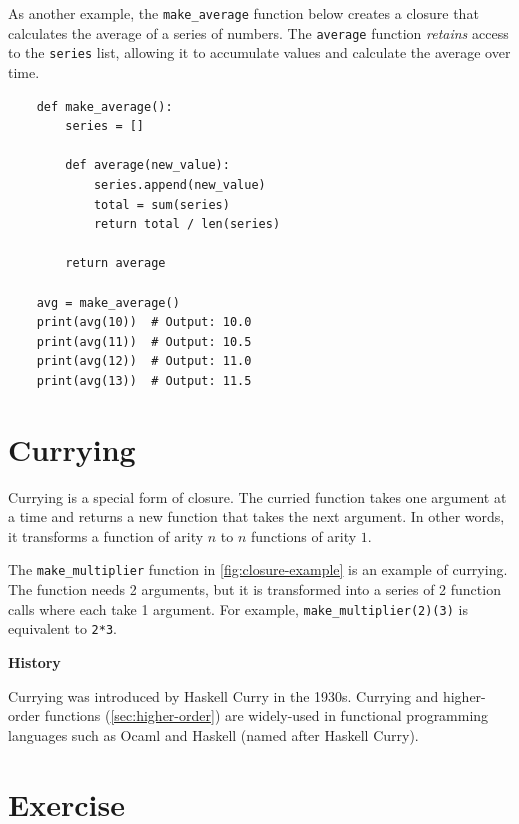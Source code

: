 \documentclass[oneside,11pt,dvipsnames]{book}
\newenvironment{historybox}[1][]{
  \small
  \begin{myhistorybox}
    {\small \textbf{#1}}
  }{
  \end{myhistorybox}
}
\newcommand{\code}[1]{\texttt{#1}}
\begin{document}
As another example, the \code{make\_average} function below creates a closure that calculates the average of a series of numbers. The \code{average} function \emph{retains} access to the \code{series} list, allowing it to accumulate values and calculate the average over time.


\begin{lstlisting}
    def make_average():
        series = []

        def average(new_value):
            series.append(new_value)
            total = sum(series)
            return total / len(series)

        return average

    avg = make_average()
    print(avg(10))  # Output: 10.0
    print(avg(11))  # Output: 10.5
    print(avg(12))  # Output: 11.0
    print(avg(13))  # Output: 11.5
\end{lstlisting}







\section{Currying}\label{sec:curry}

Currying is a special form of closure. The curried function takes one argument at a time and returns a new function that takes the next argument. In other words, it transforms a function of arity $n$ to $n$ functions of arity $1$.

The \code{make\_multiplier} function in \autoref{fig:closure-example} is an example of currying. The function needs 2 arguments, but it is transformed into a series of 2 function calls where each take 1 argument. For example, \code{make\_multiplier(2)(3)} is equivalent to \code{2*3}.


\begin{historybox}[History] 
    Currying was introduced by Haskell Curry in the 1930s. Currying and higher-order functions (\autoref{sec:higher-order}) are widely-used in functional programming languages such as Ocaml and Haskell (named after Haskell Curry).
\end{historybox}

\section{Exercise}
\end{document}

